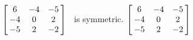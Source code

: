 {$\left[\hskip -3pt \begin{array}{ccc} 6&-4&-5\\  -4&0&2
\\  -5&2&-2\end{array}\hskip -3pt \right]
$} 
{\tta\ is symmetric. $\left[\hskip -3pt \begin{array}{ccc} 6&-4&-5\\  -4&0&2
\\  -5&2&-2\end{array}\hskip -3pt \right]
$}


  


